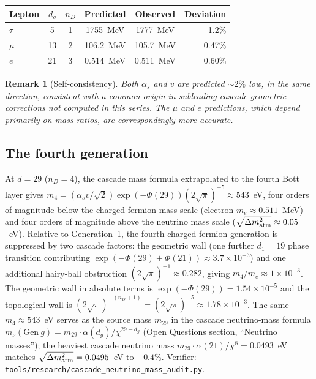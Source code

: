 \documentclass[12pt,a4paper]{article}
\newtheorem*{remark}{Remark}
\begin{document}
\begin{center}
\begin{tabular}{lccccr}
\hline
Lepton & $d_g$ & $n_D$ & Predicted & Observed & Deviation \\
\hline
$\tau$ & 5 & 1 & 1755~MeV & 1777~MeV & 1.2\% \\
$\mu$ & 13 & 2 & 106.2~MeV & 105.7~MeV & 0.47\% \\
$e$ & 21 & 3 & 0.514~MeV & 0.511~MeV & 0.60\% \\
\hline
\end{tabular}
\end{center}

\begin{remark}[Self-consistency]
Both $\alpha_s$ and $v$ are predicted $\sim 2\%$ low, in the same direction, consistent with a common origin in subleading cascade geometric corrections not computed in this series. The $\mu$ and $e$ predictions, which depend primarily on mass ratios, are correspondingly more accurate.
\end{remark}

\subsection{The fourth generation}

At $d = 29$ ($n_D = 4$), the cascade mass formula extrapolated to the fourth Bott layer gives $m_4 = (\alpha_s v/\sqrt{2})\exp(-\Phi(29))(2\sqrt{\pi})^{-5} \approx 543$~eV, four orders of magnitude below the charged-fermion mass scale (electron $m_e \approx 0.511$~MeV) and four orders of magnitude above the neutrino mass scale ($\sqrt{\Delta m^2_{\rm atm}} \approx 0.05$~eV). Relative to Generation~1, the fourth charged-fermion generation is suppressed by two cascade factors: the geometric wall (one further $d_1 = 19$ phase transition contributing $\exp(-\Phi(29)+\Phi(21)) \approx 3.7\times 10^{-3}$) and one additional hairy-ball obstruction $(2\sqrt{\pi})^{-1} \approx 0.282$, giving $m_4/m_e \approx 1\times 10^{-3}$. The geometric wall in absolute terms is $\exp(-\Phi(29)) = 1.54\times 10^{-5}$ and the topological wall is $(2\sqrt{\pi})^{-(n_D+1)} = (2\sqrt{\pi})^{-5} \approx 1.78\times 10^{-3}$. The same $m_4 \approx 543$~eV serves as the source mass $m_{29}$ in the cascade neutrino-mass formula $m_\nu(\text{Gen}~g) = m_{29}\cdot\alpha(d_g)/\chi^{29 - d_g}$ (Open Questions section, ``Neutrino masses''); the heaviest cascade neutrino mass $m_{29}\cdot\alpha(21)/\chi^8 = 0.0493$~eV matches $\sqrt{\Delta m^2_{\rm atm}} = 0.0495$~eV to $-0.4\%$. Verifier: \texttt{tools/research/cascade\_neutrino\_mass\_audit.py}.
\end{document}
